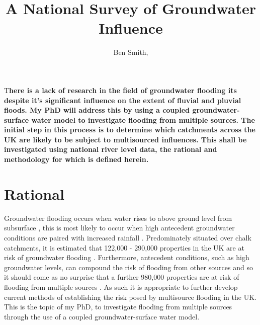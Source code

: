 \documentclass[DIV=calc, paper=a4, fontsize=11pt, twocolumn]{scrartcl}	 %
\title{A National Survey of Groundwater Influence} %
\author{Ben Smith, } %
\date{} %
\newcommand{\initial}[1]{ %
\lettrine[lines=3,lhang=0.3,nindent=0em]{
\color{DarkGoldenrod}
{\textsf{#1}}}{}}
\begin{document}
\maketitle %

\thispagestyle{fancy} %


\initial{T}\textbf{here is a lack of research in the field of groundwater flooding its despite it's significant influence on the extent of fluvial and pluvial floods. My PhD will address this by using a coupled groundwater-surface water model to investigate flooding from multiple sources. The initial step in this process is to determine which catchments across the UK are likely to be subject to multisourced influences. This shall be investigated using national river level data, the rational and methodology for which is defined herein.}


\section{Rational}
Groundwater flooding occurs when water rises to above ground level from subsurface \citep{Naughton2015}, this is most likely to occur when high antecedent groundwater conditions are paired with increased rainfall \citep{Macdonald2008}. Predominately situated over chalk catchments, it is estimated that 122,000 - 290,000 properties in the UK are at risk of groundwater flooding \citep{McKenzie2015}. Furthermore, antecedent conditions, such as high groundwater levels, can compound the risk of flooding from other sources \citep{An2014} and so it should come as no surprise that a further 980,000 properties are at risk of flooding from multiple sources \citep{McKenzie2015}. As such it is appropriate to further develop current methods of establishing the risk posed by multisource flooding in the UK. This is the topic of my PhD, to investigate flooding from multiple sources through the use of a coupled groundwater-surface water model.
\end{document}
